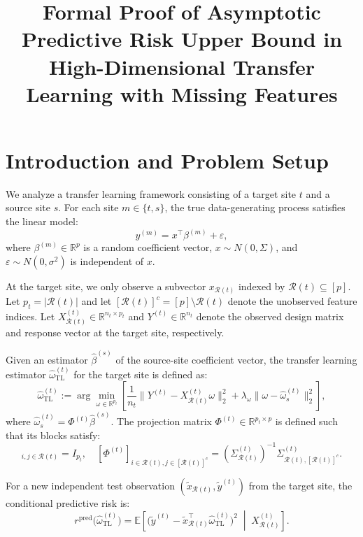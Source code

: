 \documentclass{article}
\begin{document}
\title{Formal Proof of Asymptotic Predictive Risk Upper Bound in High-Dimensional Transfer Learning with Missing Features}
\maketitle

\section{Introduction and Problem Setup}
We analyze a transfer learning framework consisting of a target site $t$ and a source site $s$. For each site $m \in \{t, s\}$, the true data-generating process satisfies the linear model:
\begin{equation}
y^{(m)} = x^\top \beta^{(m)} + \varepsilon,
\end{equation}
where $\beta^{(m)} \in \mathbb{R}^p$ is a random coefficient vector, $x \sim N(0, \Sigma)$, and $\varepsilon \sim N(0, \sigma^2)$ is independent of $x$. 

At the target site, we only observe a subvector $x_{\mathcal{R}(t)}$ indexed by $\mathcal{R}(t) \subseteq [p]$. Let $p_t = |\mathcal{R}(t)|$ and let $[\mathcal{R}(t)]^c = [p] \setminus \mathcal{R}(t)$ denote the unobserved feature indices. Let $X^{(t)}_{\mathcal{R}(t)} \in \mathbb{R}^{n_t \times p_t}$ and $Y^{(t)} \in \mathbb{R}^{n_t}$ denote the observed design matrix and response vector at the target site, respectively.

Given an estimator $\hat{\beta}^{(s)}$ of the source-site coefficient vector, the transfer learning estimator $\hat\omega_{\mathrm{TL}}^{(t)}$ for the target site is defined as:
\begin{equation}
\hat\omega_{\mathrm{TL}}^{(t)} := \arg\min_{\omega \in \mathbb{R}^{p_t}} \left[ \frac{1}{n_t} \|Y^{(t)} - X^{(t)}_{\mathcal{R}(t)} \omega\|_2^2 + \lambda_\omega \|\omega - \hat{\omega}_s^{(t)}\|_2^2 \right],
\end{equation}
where $\hat\omega_{s}^{(t)} = \Phi^{(t)} \hat\beta^{(s)}$. The projection matrix $\Phi^{(t)} \in \mathbb{R}^{p_t \times p}$ is defined such that its blocks satisfy:
\begin{equation}
[\Phi^{(t)}]_{i,j \in \mathcal{R}(t)} = I_{p_t}, \quad [\Phi^{(t)}]_{i \in \mathcal{R}(t), j \in [\mathcal{R}(t)]^c} = \left(\Sigma^{(t)}_{\mathcal{R}(t)}\right)^{-1} \Sigma^{(t)}_{\mathcal{R}(t), [\mathcal{R}(t)]^c}.
\end{equation}

For a new independent test observation $(\tilde x_{\mathcal{R}(t)}, \tilde y^{(t)})$ from the target site, the conditional predictive risk is:
\begin{equation}
r^{\mathrm{pred}}\!\bigl(\hat\omega_{\mathrm{TL}}^{(t)}\bigr) = \mathbb{E}\left[ \bigl(\tilde y^{(t)} - \tilde x_{\mathcal{R}(t)}^\top \hat\omega_{\mathrm{TL}}^{(t)}\bigr)^2 \;\middle|\; X_{\mathcal{R}(t)}^{(t)} \right].
\end{equation}
\end{document}
